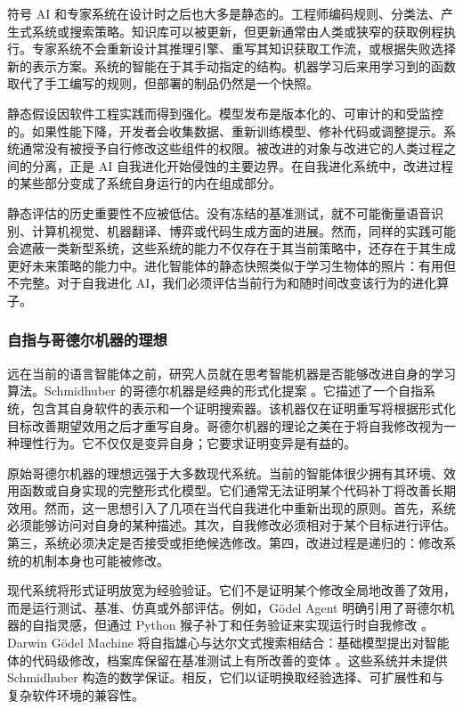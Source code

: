 符号 AI 和专家系统在设计时之后也大多是静态的。工程师编码规则、分类法、产生式系统或搜索策略。知识库可以被更新，但更新通常由人类或狭窄的获取例程执行。专家系统不会重新设计其推理引擎、重写其知识获取工作流，或根据失败选择新的表示方案。系统的智能在于其手动指定的结构。机器学习后来用学习到的函数取代了手工编写的规则，但部署的制品仍然是一个快照。

静态假设因软件工程实践而得到强化。模型发布是版本化的、可审计的和受监控的。如果性能下降，开发者会收集数据、重新训练模型、修补代码或调整提示。系统通常没有被授予自行修改这些组件的权限。被改进的对象与改进它的人类过程之间的分离，正是 AI 自我进化开始侵蚀的主要边界。在自我进化系统中，改进过程的某些部分变成了系统自身运行的内在组成部分。

静态评估的历史重要性不应被低估。没有冻结的基准测试，就不可能衡量语音识别、计算机视觉、机器翻译、博弈或代码生成方面的进展。然而，同样的实践可能会遮蔽一类新型系统，这些系统的能力不仅存在于其当前策略中，还存在于其生成更好未来策略的能力中。进化智能体的静态快照类似于学习生物体的照片：有用但不完整。对于自我进化 AI，我们必须评估当前行为和随时间改变该行为的进化算子。

\subsubsection{自指与哥德尔机器的理想}

远在当前的语言智能体之前，研究人员就在思考智能机器是否能够改进自身的学习算法。Schmidhuber 的哥德尔机器是经典的形式化提案 \cite{schmidhuber2003}。它描述了一个自指系统，包含其自身软件的表示和一个证明搜索器。该机器仅在证明重写将根据形式化目标改善期望效用之后才重写自身。哥德尔机器的理论之美在于将自我修改视为一种理性行为。它不仅仅是变异自身；它要求证明变异是有益的。

原始哥德尔机器的理想远强于大多数现代系统。当前的智能体很少拥有其环境、效用函数或自身实现的完整形式化模型。它们通常无法证明某个代码补丁将改善长期效用。然而，这一思想引入了几项在当代自我进化中重新出现的原则。首先，系统必须能够访问对自身的某种描述。其次，自我修改必须相对于某个目标进行评估。第三，系统必须决定是否接受或拒绝候选修改。第四，改进过程是递归的：修改系统的机制本身也可能被修改。

现代系统将形式证明放宽为经验验证。它们不是证明某个修改全局地改善了效用，而是运行测试、基准、仿真或外部评估。例如，G{\"o}del Agent 明确引用了哥德尔机器的自指灵感，但通过 Python 猴子补丁和任务验证来实现运行时自我修改 \cite{yin2024godel}。Darwin G{\"o}del Machine 将自指雄心与达尔文式搜索相结合：基础模型提出对智能体的代码级修改，档案库保留在基准测试上有所改善的变体 \cite{darwingodelmachine2025}。这些系统并未提供 Schmidhuber 构造的数学保证。相反，它们以证明换取经验选择、可扩展性和与复杂软件环境的兼容性。

